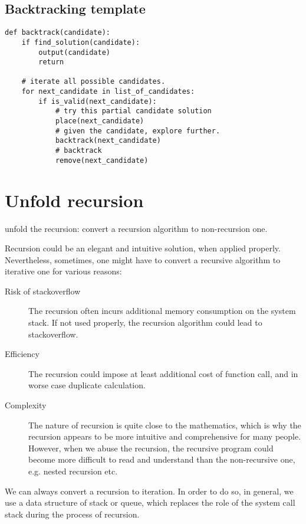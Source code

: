 \subsection{Backtracking template}

\begin{lstlisting}
def backtrack(candidate):
    if find_solution(candidate):
        output(candidate)
        return
    
    # iterate all possible candidates.
    for next_candidate in list_of_candidates:
        if is_valid(next_candidate):
            # try this partial candidate solution
            place(next_candidate)
            # given the candidate, explore further.
            backtrack(next_candidate)
            # backtrack
            remove(next_candidate)  
\end{lstlisting}



\section{Unfold recursion}

unfold the recursion: convert a recursion algorithm to non-recursion one.


Recursion could be an elegant and intuitive solution, when applied properly.
Nevertheless, sometimes, one might have to convert a recursive algorithm to iterative one for various reasons:
\begin{description}
\item[Risk of stackoverflow] The recursion often incurs additional memory consumption on the system stack. If not used properly, the recursion algorithm could lead to stackoverflow.
\item[Efficiency] The recursion could impose at least additional cost of function call, and in worse case duplicate calculation.
\item[Complexity] The nature of recursion is quite close to the mathematics, which is why the recursion appears to be more intuitive and comprehensive for many people. However, when we abuse the recursion, the recursive program could become more difficult to read and understand than the non-recursive one, e.g. nested recursion etc.
\end{description}

\begin{tcolorbox}
  We can always convert a recursion to iteration.
  In order to do so, in general, we use a data structure of stack or queue, which replaces the role of the system call stack during the process of recursion.
\end{tcolorbox}


